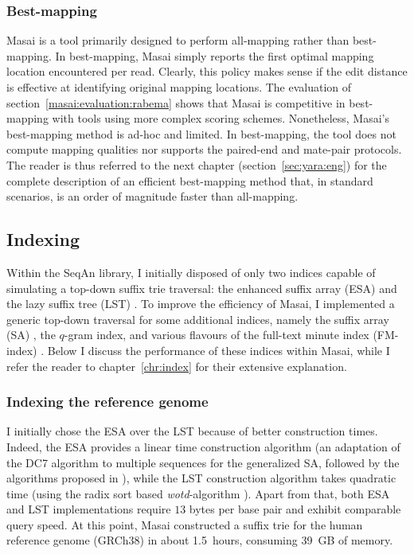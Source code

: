 \subsubsection{Best-mapping}

Masai is a tool primarily designed to perform all-mapping rather than best-mapping.
In best-mapping, Masai simply reports the first optimal mapping location encountered per read.
Clearly, this policy makes sense if the edit distance is effective at identifying original mapping locations.
The evaluation of section~\ref{masai:evaluation:rabema} shows that Masai is competitive in best-mapping with tools using more complex scoring schemes.
Nonetheless, Masai's best-mapping method is ad-hoc and limited.
In best-mapping, the tool does not compute mapping qualities nor supports the paired-end and mate-pair protocols.
The reader is thus referred to the next chapter (section~\ref{sec:yara:eng}) for the complete description of an efficient best-mapping method that, in standard scenarios, is an order of magnitude faster than all-mapping.

\subsection{Indexing}
\label{masai:engineering:index}

Within the SeqAn library, I initially disposed of only two indices capable of simulating a top-down suffix trie traversal: the enhanced suffix array (ESA) \citep{Abouelhoda2004} and the lazy suffix tree (LST) \citep{Giegerich1999}.
To improve the efficiency of Masai, I implemented a generic top-down traversal for some additional indices, namely the suffix array (SA) \citep{Manber1990}, the $q$-gram index, and various flavours of the full-text minute index (FM-index) \citep{Ferragina2001}.
Below I discuss the performance of these indices within Masai, while I refer the reader to chapter~\ref{chr:index} for their extensive explanation.

\subsubsection{Indexing the reference genome}

I initially chose the ESA over the LST because of better construction times.
Indeed, the ESA provides a linear time construction algorithm (an adaptation of the DC7 algorithm \citep{Dementiev2008} to multiple sequences \citep{Weese2013} for the generalized SA, followed by the algorithms proposed in \citep{Kasai2001,Abouelhoda2004}), while the LST construction algorithm takes quadratic time (using the radix sort based \emph{wotd}-algorithm \citep{Giegerich1999}).
Apart from that, both ESA and LST implementations require $13$ bytes per base pair and exhibit comparable query speed.
At this point, Masai constructed a suffix trie for the human reference genome (GRCh38) in about 1.5~hours, consuming 39~GB of memory.


